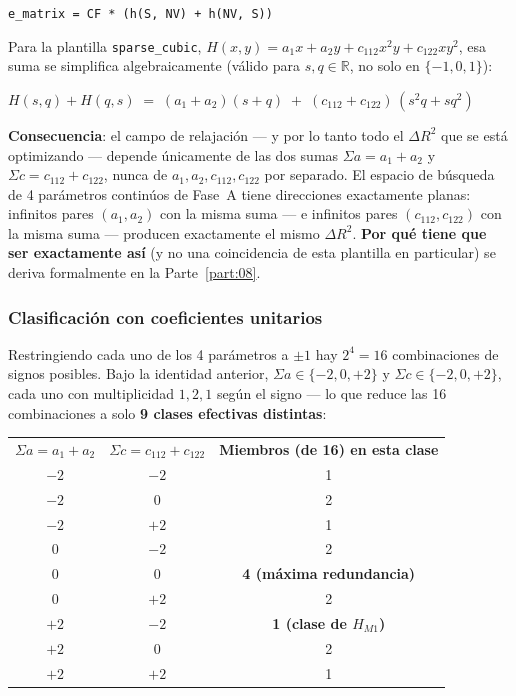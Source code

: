 \documentclass[11pt, a4paper]{article}
\newcommand{\TH}[1]{\cellcolor{cTHbg}\color{white}\textbf{#1}}
\newcommand{\good}[1]{\color{cGood}\textbf{#1}}
\newcommand{\bad}[1]{\color{cBad}\textbf{#1}}
\begin{document}
\begin{tcolorbox}[codebox]
\texttt{e\_matrix = CF * (h(S, NV) + h(NV, S))}
\end{tcolorbox}

Para la plantilla \texttt{sparse\_cubic},
$H(x,y)=a_1x+a_2y+c_{112}x^2y+c_{122}xy^2$, esa suma se simplifica
algebraicamente (v\'alido para $s,q\in\mathbb{R}$, no solo en
$\{-1,0,1\}$):

\begin{tcolorbox}[codebox]
$H(s,q)+H(q,s) \;=\; (a_1+a_2)(s+q) \;+\; (c_{112}+c_{122})\,(s^2q+sq^2)$
\end{tcolorbox}

\begin{tcolorbox}[quotebox]
  \textbf{Consecuencia}: el campo de relajaci\'on --- y por lo tanto
  todo el $\Delta R^2$ que se est\'a optimizando --- depende
  \'unicamente de las dos sumas $\Sigma a = a_1+a_2$ y
  $\Sigma c = c_{112}+c_{122}$, nunca de $a_1,a_2,c_{112},c_{122}$
  por separado. El espacio de b\'usqueda de 4 par\'ametros contin\'uos
  de Fase~A tiene direcciones exactamente planas: infinitos pares
  $(a_1,a_2)$ con la misma suma --- e infinitos pares
  $(c_{112},c_{122})$ con la misma suma --- producen exactamente el
  mismo $\Delta R^2$. \textbf{Por qu\'e tiene que ser exactamente as\'i}
  (y no una coincidencia de esta plantilla en particular) se deriva
  formalmente en la Parte~\ref{part:08}.
\end{tcolorbox}

\subsubsection{Clasificaci\'on con coeficientes unitarios}

Restringiendo cada uno de los 4 par\'ametros a $\pm1$ hay
$2^4=16$ combinaciones de signos posibles. Bajo la identidad anterior,
$\Sigma a\in\{-2,0,+2\}$ y $\Sigma c\in\{-2,0,+2\}$, cada uno con
multiplicidad $1,2,1$ seg\'un el signo --- lo que reduce las 16
combinaciones a solo \textbf{9 clases efectivas distintas}:

\medskip
\begin{center}
\begin{tabular}{ccc}
  \TH{$\Sigma a=a_1+a_2$} & \TH{$\Sigma c=c_{112}+c_{122}$} & \TH{Miembros (de 16) en esta clase} \\[1pt]
  $-2$ & $-2$ & 1 \\
  $-2$ & $0$  & 2 \\
  $-2$ & $+2$ & 1 \\
  $0$  & $-2$ & 2 \\
  $0$  & $0$  & \bad{4 (m\'axima redundancia)} \\
  $0$  & $+2$ & 2 \\
  $+2$ & $-2$ & \good{1 (clase de $H_{M1}$)} \\
  $+2$ & $0$  & 2 \\
  $+2$ & $+2$ & 1 \\
\end{tabular}
\end{center}
\medskip
\end{document}
